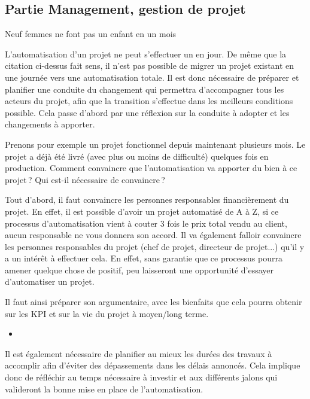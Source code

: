 
\subsection{Partie Management, gestion de projet}


\epigraph{Neuf femmes ne font pas un enfant en un mois}{\cite{manmonth}}

L'automatisation d'un projet ne peut s'effectuer un en jour. De même que la citation ci-dessus fait sens, il n'est pas possible de migrer un projet existant en une journée vers une automatisation totale. Il est donc nécessaire de préparer et planifier une conduite du changement qui permettra d'accompagner tous les acteurs du projet, afin que la transition s'effectue dans les meilleurs conditions possible. Cela passe d'abord par une réflexion sur la conduite à adopter et les changements à apporter. 

Prenons pour exemple un projet fonctionnel depuis maintenant plusieurs mois. Le projet a déjà été livré (avec plus ou moins de difficulté) quelques fois en production. Comment convaincre que l'automatisation va apporter du bien à ce projet ? Qui est-il nécessaire de convaincre ?

Tout d'abord, il faut convaincre les personnes responsables financièrement du projet. En effet, il est possible d'avoir un projet automatisé de A à Z, si ce processus d'automatisation vient à couter 3 fois le prix total vendu au client, aucun responsable ne vous donnera son accord. Il va également falloir convaincre les personnes responsables du projet (chef de projet, directeur de projet...) qu'il y a un intérêt à effectuer cela. En effet, sans garantie que ce processus pourra amener quelque chose de positif, peu laisseront une opportunité d'essayer d'automatiser un projet.


Il faut ainsi préparer son argumentaire, avec les bienfaits que cela pourra obtenir sur les \gls{KPI} et sur la vie du projet à moyen/long terme.

\begin{itemize}
	\item {}
\end{itemize}

Il est également nécessaire de planifier au mieux les durées des travaux à accomplir afin d'éviter des dépassements dans les délais annoncés. Cela implique donc de réfléchir au temps nécessaire à investir et aux différents jalons qui valideront la bonne mise en place de l'automatisation. 


